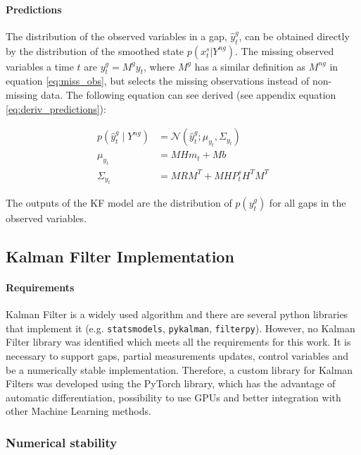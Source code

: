\documentclass{article}
\newcommand{\norm}[3]{\mathcal{N}\left(#1; #2, #3\right)} %
\let\Oldsubsection\subsection
\renewcommand{\subsection}{\FloatBarrier\Oldsubsection}
\begin{document}
\paragraph{Predictions}

The distribution of the observed variables in a gap, $\hat{y}^g_t$, can be obtained directly by the distribution of the smoothed state $p(x_t^s | Y^{ng})$.
The missing observed variables a time $t$ are $y^g_t = M^gy_t$, where $M^{g}$ has a similar definition as $M^{ng}$ in equation \ref{eq:miss_obs}, but selects the missing observations instead of  non-missing data.
The following equation can see derived (see appendix equation \ref{eq:deriv_predictions}):

\begin{align}\label{eq:filter_predictions}
    p(\hat{y}^g_t \mid Y^{ng}) &= \norm{\hat{y}^g_t}{\mu_{y_t}}{\Sigma_{y_t}} \\
    \mu_{y_t} &= MHm_t + Mb \\
    \Sigma_{y_t} &= MRM^T + MHP^s_tH^TM^T
\end{align}

The outputs of the KF model are the distribution of $p(y^g_t)$ for all gaps in the observed variables. 

\subsection{Kalman Filter Implementation}

\paragraph{Requirements}

Kalman Filter is a widely used algorithm and there are several python libraries that implement it (e.g. \verb|statsmodels|, \verb|pykalman|, \verb|filterpy|). However, no  Kalman Filter library was identified which meets all the requirements for this work. It is necessary to support gaps, partial measurements updates, control variables and be a numerically stable implementation.
Therefore, a custom library for Kalman Filters was developed using the PyTorch library, which has the advantage of automatic differentiation, possibility to use GPUs and better integration with other Machine Learning methods.

\subsubsection{Numerical stability}
\end{document}
